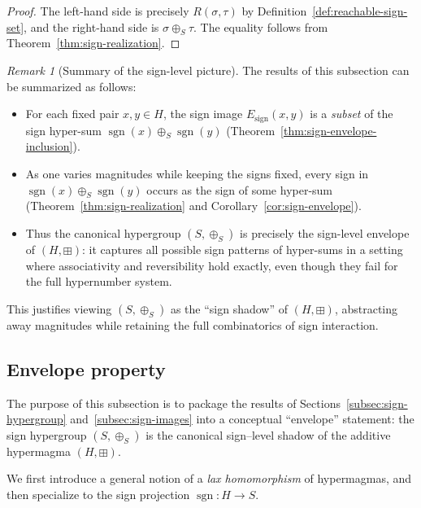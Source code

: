 \documentclass[11pt]{amsart}
\numberwithin{equation}{section}
\theoremstyle{definition}
\theoremstyle{remark}
\newtheorem{remark}[theorem]{Remark}
\newcommand{\Hnum}{H}                      %
\newcommand{\Sset}{S}                      %
\newcommand{\sgn}{\operatorname{sgn}}
\newcommand{\op}{\boxplus}                 %
\newcommand{\sop}{\oplus_S}                %
\begin{document}
\begin{proof}
The left-hand side is precisely $R(\sigma,\tau)$ by
Definition~\ref{def:reachable-sign-set}, and the right-hand side is
$\sigma\sop\tau$.  The equality follows from
Theorem~\ref{thm:sign-realization}.
\end{proof}

\begin{remark}[Summary of the sign-level picture]
\label{rem:sign-images-summary}
The results of this subsection can be summarized as follows:
\begin{itemize}[leftmargin=2em]
  \item For each fixed pair $x,y\in\Hnum$, the sign image
        $E_{\mathrm{sign}}(x,y)$ is a \emph{subset} of the sign
        hyper-sum $\sgn(x)\sop\sgn(y)$
        (Theorem~\ref{thm:sign-envelope-inclusion}).
  \item As one varies magnitudes while keeping the signs fixed, every
        sign in $\sgn(x)\sop\sgn(y)$ occurs as the sign of some
        hyper-sum (Theorem~\ref{thm:sign-realization} and
        Corollary~\ref{cor:sign-envelope}).
  \item Thus the canonical hypergroup $(\Sset,\sop)$ is precisely the
        sign-level envelope of $(\Hnum,\op)$: it captures all possible
        sign patterns of hyper-sums in a setting where associativity
        and reversibility hold exactly, even though they fail for the
        full hypernumber system.
\end{itemize}
This justifies viewing $(\Sset,\sop)$ as the ``sign shadow'' of
$(\Hnum,\op)$, abstracting away magnitudes while retaining the full
combinatorics of sign interaction.
\end{remark}

\subsection{Envelope property}
\label{subsec:envelope-property}

The purpose of this subsection is to package the results of
Sections~\ref{subsec:sign-hypergroup} and~\ref{subsec:sign-images}
into a conceptual ``envelope'' statement: the sign hypergroup
$(\Sset,\sop)$ is the canonical sign--level shadow of the additive
hypermagma $(\Hnum,\op)$.

\medskip

We first introduce a general notion of a \emph{lax homomorphism} of
hypermagmas, and then specialize to the sign projection
$\sgn:\Hnum\to\Sset$.
\end{document}
